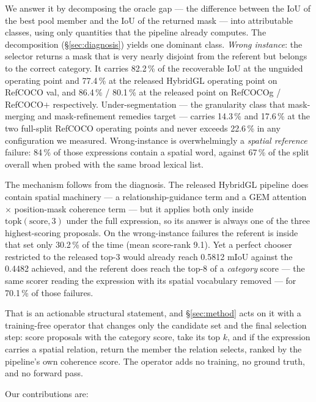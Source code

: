 We answer it by decomposing the oracle gap --- the difference between the IoU
of the best pool member and the IoU of the returned mask --- into attributable
classes, using only quantities that the pipeline already computes. The
decomposition (§\ref{sec:diagnosis}) yields one dominant class. \emph{Wrong
instance}: the selector returns a mask that is very nearly disjoint from the
referent but belongs to the correct category. It carries 82.2\,\% of the
recoverable IoU at the unguided operating point and 77.4\,\% at the released
HybridGL operating point on RefCOCO val, and 86.4\,\% / 80.1\,\% at the
released point on RefCOCOg / RefCOCO$+$ respectively. Under-segmentation ---
the granularity class that mask-merging and mask-refinement remedies target ---
carries 14.3\,\% and 17.6\,\% at the two full-split RefCOCO operating points
and never exceeds 22.6\,\% in any configuration we measured. Wrong-instance is
overwhelmingly a \emph{spatial reference} failure: 84\,\% of those
expressions contain a spatial word, against 67\,\% of the split overall when
probed with the same broad lexical list.

The mechanism follows from the diagnosis. The released HybridGL pipeline does
contain spatial machinery --- a relationship-guidance term and a GEM attention
$\times$ position-mask coherence term --- but it applies both only inside
$\mathrm{topk}(\text{score},3)$ under the full expression, so its answer is
always one of the three highest-scoring proposals. On the wrong-instance
failures the referent is inside that set only 30.2\,\% of the time (mean
score-rank 9.1). Yet a perfect chooser restricted to the released top-3 would
already reach 0.5812 mIoU against the 0.4482 achieved, and the referent does
reach the top-8 of a \emph{category} score --- the same scorer reading the
expression with its spatial vocabulary removed --- for 70.1\,\% of those
failures.

That is an actionable structural statement, and §\ref{sec:method} acts on it
with a training-free operator that changes only the candidate set and the
final selection step: score proposals with the category score, take its top
$k$, and if the expression carries a spatial relation, return the member the
relation selects, ranked by the pipeline's own coherence score. The operator
adds no training, no ground truth, and no forward pass.

Our contributions are:

